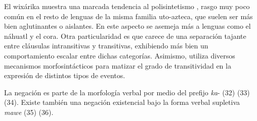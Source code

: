 El wixárika muestra una marcada tendencia al polisintetismo \textcolor{MidnightBlue}{\citep{Huichol}}, rasgo muy poco común en el resto de lenguas de la misma familia uto-azteca, que suelen ser más bien aglutinantes o aislantes. En este aspecto se asemeja más a lenguas como el náhuatl y el cora. Otra particularidad es que carece de una separación tajante entre cláusulas intransitivas y transitivas, exhibiendo más bien un comportamiento escalar entre dichas categorías. Asimismo, utiliza diversos mecanismos morfosintácticos para matizar el grado de transitividad en la expresión de distintos tipos de eventos.

La negación es parte de la morfología verbal por medio del prefijo {\setmainfont{Charis SIL} \textit{ka}-} (32) (33) (34). Existe también una negación existencial bajo la forma verbal supletiva {\setmainfont{Charis SIL} \textit{mawe}} (35) (36).